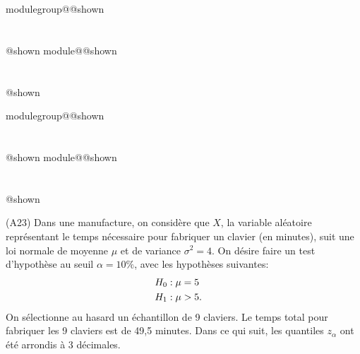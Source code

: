 \documentclass{Evaluation}
\makeatletter
\newcommand{\currentmodulekey}{}
\newcommand{\currentmoduletitle}{}
\newcommand{\currentgroupkey}{}
\newcommand{\currentgrouptitle}{}
\newcommand{\showmoduleifneeded}{%
  \ifx\currentgroupkey\empty\else
    \expandafter\ifx\csname modulegroup@\currentgroupkey @shown\endcsname\relax
      \section*{\currentgrouptitle}%
      \expandafter\gdef\csname modulegroup@\currentgroupkey @shown\endcsname{1}%
    \fi
  \fi
  \expandafter\ifx\csname module@\currentmodulekey @shown\endcsname\relax
    \section*{\currentmoduletitle}%
    \expandafter\gdef\csname module@\currentmodulekey @shown\endcsname{1}%
  \fi
}
\newenvironment{A23}{\showmoduleifneeded}{}
\makeatother
\begin{document}
\begin{questions}
\begin{A23}
\begin{parts}
\end{parts}
\end{A23}

\begin{A23}
\question
(A23)
Dans une manufacture, on considère que $X$, la variable aléatoire représentant le temps nécessaire pour fabriquer un clavier (en minutes), suit une loi normale de moyenne $\mu$ et de variance $\sigma^2=4$. On désire faire un test d'hypothèse au seuil $\alpha=10\%$, avec les hypothèses suivantes:
\begin{align*}
	H_0&: \mu=5\cr
	H_1&: \mu > 5.
\end{align*}
On sélectionne au hasard un échantillon de 9 claviers. Le temps total pour fabriquer les 9 claviers est de 49,5 minutes. Dans ce qui suit, les quantiles $z_\alpha$ ont été arrondis à 3 décimales.

\begin{center}
    

\end{center}
\end{A23}
\end{questions}
\end{document}
